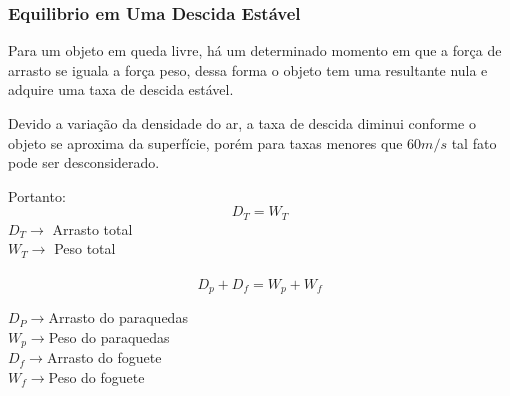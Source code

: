\documentclass[a4paper, 12pt]{article}[abntex2]
\begin{document}
{                \subsubsection{Equilibrio em Uma Descida Estável}
                    Para um objeto em queda livre, há um determinado momento em que a força de arrasto se iguala a força peso, dessa forma o objeto tem uma resultante nula e adquire uma taxa de descida estável.\par Devido a variação da densidade do ar, a taxa de descida diminui conforme o objeto se aproxima da superfície, porém para taxas menores que $60m/s$ tal fato pode ser desconsiderado\cite{knacke92}.\par
                    Portanto:
                    \begin{equation}
                        D_T = W_T
                    \end{equation}
                    $D_T \rightarrow$ Arrasto total\\
                    $W_T \rightarrow$ Peso total\\
                    \\
                    \begin{equation}
                        D_p + D_f = W_p + W_f
                    \end{equation}
                    
                    \begin{flushleft}
                    $D_P \rightarrow $Arrasto do paraquedas\\
                    $W_p \rightarrow $Peso do paraquedas\\
                    $D_f \rightarrow $Arrasto do foguete\\
                    $W_f \rightarrow $Peso do foguete\\
                    \end{flushleft}
                    \vspace{1.5cm}
}
\end{document}
